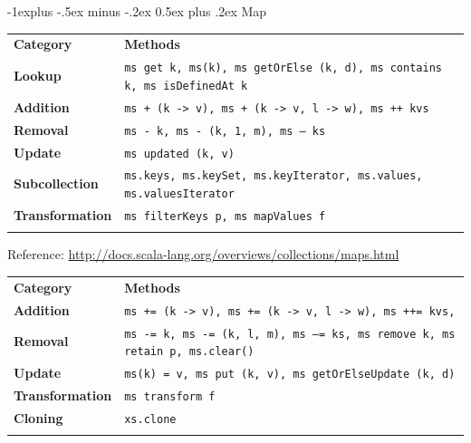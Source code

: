 \documentclass[a4paper,twoside,10pt,landscape]{article}
\makeatletter
\renewcommand{\subsection}{\@startsection{subsection}{2}{0mm}%
                                {-1explus -.5ex minus -.2ex}%
                                {0.5ex plus .2ex}%
                                {\normalfont\normalsize\bfseries}}
\makeatother
\begin{document}
\begin{multicols}{3}
\subsection{Map}
\begin{center}
\begin{tabular}{@{}lp{6cm}@{}}
\hline\noalign{\smallskip}
\textbf{Category} & \textbf{Methods} \\
\noalign{\smallskip}\hline\noalign{\smallskip}
\textbf{Lookup} & \texttt{ms get k, ms(k), ms getOrElse (k, d), ms contains k, ms isDefinedAt k}\\
\textbf{Addition} & \texttt{ms + (k -> v), ms + (k -> v, l -> w), ms ++ kvs}\\
\textbf{Removal} & \texttt{ms - k, ms - (k, 1, m), ms -- ks}\\
\textbf{Update} & \texttt{ms updated (k, v)}\\
\textbf{Subcollection} & \texttt{ms.keys, ms.keySet, ms.keyIterator, ms.values, ms.valuesIterator}\\
\textbf{Transformation} & \texttt{ms filterKeys p, ms mapValues f}\\
\noalign{\smallskip}\hline
\end{tabular}
\raggedright{\tiny{Reference: \url{http://docs.scala-lang.org/overviews/collections/maps.html}}}
\end{center}

\begin{center}
\begin{tabular}{@{}lp{6cm}@{}}
\hline\noalign{\smallskip}
\textbf{Category} & \textbf{Methods} \\
\noalign{\smallskip}\hline\noalign{\smallskip}
\textbf{Addition} & \texttt{ms += (k -> v), ms += (k -> v, l -> w), ms ++= kvs, }\\
\textbf{Removal} & \texttt{ms -= k, ms -= (k, l, m), ms --= ks, ms remove k, ms retain p, ms.clear()}\\
\textbf{Update} & \texttt{ms(k) = v, ms put (k, v), ms getOrElseUpdate (k, d)}\\
\textbf{Transformation} & \texttt{ms transform f}\\
\textbf{Cloning} & \texttt{xs.clone}\\
\noalign{\smallskip}\hline
\end{tabular}
\end{center}



\end{multicols}
\end{document}
